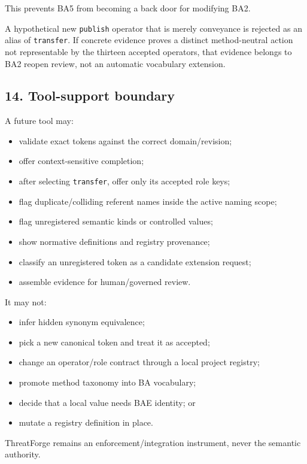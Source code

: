 \documentclass[
  10pt,
  a4paper,
]{article}
\providecommand{\tightlist}{%
  \setlength{\itemsep}{0pt}\setlength{\parskip}{0pt}}
\begin{document}
This prevents BA5 from becoming a back door for modifying BA2.

A hypothetical new \texttt{publish} operator that is merely conveyance
is rejected as an alias of \texttt{transfer}. If concrete evidence
proves a distinct method-neutral action not representable by the
thirteen accepted operators, that evidence belongs to BA2 reopen review,
not an automatic vocabulary extension.

\subsection{14. Tool-support boundary}\label{tool-support-boundary}

A future tool may:

\begin{itemize}
\tightlist
\item
  validate exact tokens against the correct domain/revision;
\item
  offer context-sensitive completion;
\item
  after selecting \texttt{transfer}, offer only its accepted role keys;
\item
  flag duplicate/colliding referent names inside the active naming
  scope;
\item
  flag unregistered semantic kinds or controlled values;
\item
  show normative definitions and registry provenance;
\item
  classify an unregistered token as a candidate extension request;
\item
  assemble evidence for human/governed review.
\end{itemize}

It may not:

\begin{itemize}
\tightlist
\item
  infer hidden synonym equivalence;
\item
  pick a new canonical token and treat it as accepted;
\item
  change an operator/role contract through a local project registry;
\item
  promote method taxonomy into BA vocabulary;
\item
  decide that a local value needs BAE identity; or
\item
  mutate a registry definition in place.
\end{itemize}

ThreatForge remains an enforcement/integration instrument, never the
semantic authority.
\end{document}
